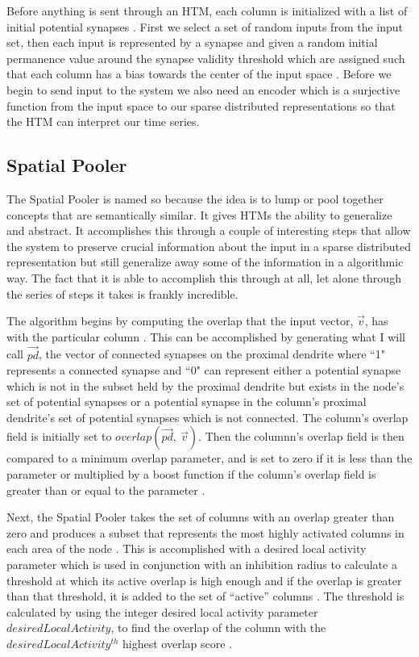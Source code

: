 \documentclass[fleqn,notitlepage,minimal]{article}
\begin{document}
	Before anything is sent through an HTM, each column is initialized with a list of initial potential synapses \cite{Whitepaper}. First we select a set of random inputs from the input set, then each input is represented by a synapse and given a random initial permanence value around the synapse validity threshold which are assigned such that each column has a bias towards the center of the input space \cite{Whitepaper}. Before we begin to send input to the system we also need an encoder which is a surjective function from the input space to our sparse distributed representations so that the HTM can interpret our time series.
	
	\subsection{Spatial Pooler}
	
	The Spatial Pooler is named so because the idea is to lump or pool together concepts that are semantically similar. It gives HTMs the ability to generalize and abstract. It accomplishes this through a couple of interesting steps that allow the system to preserve crucial information about the input in a sparse distributed representation but still generalize away some of the information in a algorithmic way. The fact that it is able to accomplish this through at all, let alone through the series of steps it takes is frankly incredible.
	
	The algorithm begins by computing the overlap that the input vector, $\overrightarrow{v}$, has with the particular column \cite{Whitepaper}. This can be accomplished by generating what I will call $\overrightarrow{pd}$, the vector of connected synapses on the proximal dendrite where ``1" represents a connected synapse and ``0" can represent either a potential synapse which is not in the subset held by the proximal dendrite but exists in the node's set of potential synapses or a potential synapse in the column's proximal dendrite's set of potential synapses which is not connected. The column's overlap field is initially set to $overlap(\overrightarrow{pd}, \ \overrightarrow{v})$. Then the columnn's overlap field is then compared to a minimum overlap parameter, and is set to zero if it is less than the parameter or multiplied by a boost function if the column's overlap field is greater than or equal to the parameter \cite{Whitepaper}.
	
	Next, the Spatial Pooler takes the set of columns with an overlap greater than zero and produces a subset that represents the most highly activated columns in each area of the node \cite{Principles}. This is accomplished with a desired local activity parameter which is used in conjunction with an inhibition radius to calculate a threshold at which its active overlap is high enough and if the overlap is greater than that threshold, it is added to the set of ``active'' columns \cite{Whitepaper}. The threshold is calculated by using the integer desired local activity parameter $desiredLocalActivity$, to find the overlap of the column with the $desiredLocalActivity^{th}$ highest overlap score \cite{Whitepaper}.
	
\end{document}
